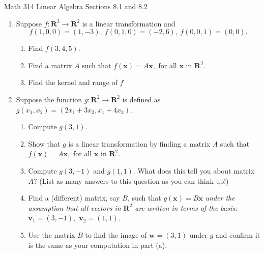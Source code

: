 \documentclass[12pt]{amsart}
\newcommand{\bv}{\mathbf{v}}
\newcommand{\bw}{\mathbf{w}}
\newcommand{\bx}{\mathbf{x}}
\newcommand{\RR}{\mathbf{R}}
\begin{document}
\scriptsize \noindent Math 314 Linear Algebra \hfill Sections 8.1 and 8.2
\normalsize\medskip


\thispagestyle{empty}
\begin{enumerate}
\item Suppose $f: \RR^3 \to \RR^2$ is a linear transformation and $$f(1,0,0)=(1,-3), \: f(0,1,0)=(-2,6), \: f(0,0,1)=(0,0).$$
	\begin{enumerate}
	\item Find $f(3,4,5).$
	\vfill
	\item Find a matrix $A$ such that $f(\bx)=A\bx,$ for all $\bx$ in $\RR^3.$
	\vfill
	\item Find the kernel and range of $f$
	\vfill
	\end{enumerate}
\item Suppose the function $g: \RR^2 \to \RR^2$ is defined as $g(x_1,x_2)=(2x_1+3x_2,x_1+4x_2).$
	\begin{enumerate}
	\item Compute $g(3,1).$
	\vfill
	\item Show that $g$ is a linear transformation by finding a matrix $A$ such that $f(\bx)=A\bx,$ for all $\bx$ in $\RR^2.$
	\vfill
	\newpage
	\item Compute $g(3,-1)$ and $g(1,1).$ What does this tell you about matrix $A$? (List as many answers to this question as you can think up!)
	\vfill
	\item Find a (different) matrix, say $B$, such that $g(\bx) = B \bx$ \emph{under the assumption that all vectors in $\RR^2$ are written in terms of the basis: $\bv_1=(3,-1),$ $\bv_2 =(1,1).$}
	\vfill
	\item Use the matrix $B$ to find the image of $\bw=(3,1)$ under $g$ and confirm it is the same as your computation in part (a).
	\vfill
	\end{enumerate}
\end{enumerate}
\end{document}
